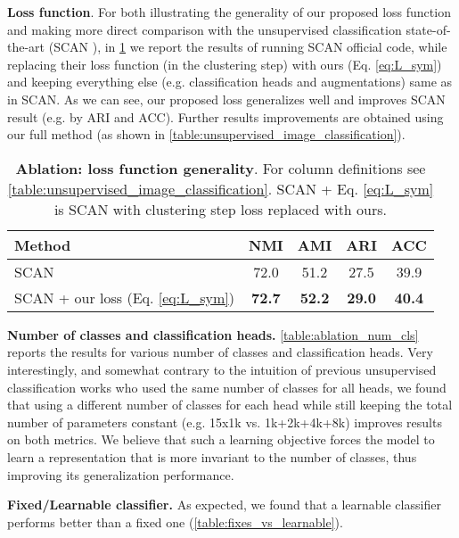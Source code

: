 \documentclass[runningheads]{llncs}
\begin{document}
\textbf{Loss function}. 
For both illustrating the generality of our proposed loss function and making more direct comparison with the unsupervised classification state-of-the-art (SCAN \cite{van2020scan}), in \cref{table:ablation_loss} we report the results of running SCAN official code, while replacing their loss function (in the clustering step) with ours (Eq. \eqref{eq:L_sym}) and keeping everything else (e.g. classification heads and augmentations) same as in SCAN. As we can see, our proposed loss generalizes well and improves SCAN result (e.g. by  ARI and  ACC). Further results improvements are obtained using our full method (as shown in \cref{table:unsupervised_image_classification}).

\begin{table}[bt]
  \centering
  \setlength\tabcolsep{4pt}
    \caption{\textbf{Ablation: loss function generality}. 
    For column definitions see \cref{table:unsupervised_image_classification}. 
    SCAN + Eq. \eqref{eq:L_sym} is SCAN with clustering step loss replaced with ours.
    }
  \label{table:ablation_loss}
  \begin{tabular}{lcccc}
    \toprule
    Method & NMI & AMI & ARI & ACC \\
    \midrule
    SCAN \cite{van2020scan} & 72.0 & 51.2 & 27.5 & 39.9 \\
    SCAN + our loss (Eq. \eqref{eq:L_sym}) & \textbf{72.7} & \textbf{52.2} & \textbf{29.0} & \textbf{40.4} \\
    \bottomrule
  \end{tabular}
\end{table}

\textbf{Number of classes and classification heads.} \cref{table:ablation_num_cls} reports the results for various number of classes and classification heads. 
Very interestingly, and somewhat contrary to the intuition of previous unsupervised classification works \cite{van2020scan,YM.2020Self-labelling} who used the same number of classes for all heads, 
we found that using a different number of classes for each head while still keeping the total number of parameters constant (e.g. 15x1k vs. 1k+2k+4k+8k) improves results on both metrics. We believe that such a learning objective forces the model to learn a representation that is more invariant to the number of classes, thus improving its generalization performance. 

\textbf{Fixed/Learnable classifier.} As expected, we found that a learnable classifier performs better than a fixed one (\cref{table:fixes_vs_learnable}).
\end{document}
